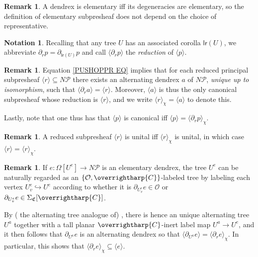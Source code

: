 \documentclass[a4paper,10pt
,draft
]{article}%
\numberwithin{equation}{section}
\numberwithin{figure}{section}
\theoremstyle{definition} %
\newtheorem{remark}[equation]{Remark}%
\newtheorem{notation}[equation]{Notation}%
\newcommand{\into}{\hookrightarrow}%
\newcommand{\vect}[1]{\text{\overrightharp{\ensuremath{#1}}}}
\renewcommand{\O}{\ensuremath{\mathcal O}}
\newcommand{\1}{\ensuremath{\mathbbm 1}}%
\begin{document}
\begin{remark}
	A dendrex is elementary iff its degeneracies are elementary,
	so the definition of elementary subpresheaf does not depend on the choice of representative.
\end{remark}


\begin{notation}
	Recalling that any tree $U$
	has an associated corolla $\mathsf{lr}(U)$, 
	we abbreviate
	$\partial_r p = \partial_{\mathsf{lr}(U)}p$
	and call
	$\langle \partial_r p \rangle$
	the \emph{reduction} of  
	$\langle p \rangle$.
\end{notation}




\begin{remark}\label{PUSHOPPRRST REM}
	Equation \eqref{PUSHOPPR EQ} 
	implies
	that for each reduced principal subpresheaf
	$\langle r \rangle \subseteq N \mathcal{P}$
	there exists an alternating dendrex $a$ of $N \mathcal P$, 
	\emph{unique up to isomorphism}, 
	such that
	$\langle \partial_r a \rangle = \langle r \rangle$.
	Moreover, $\langle a \rangle$ is thus the only canonical subpresheaf whose reduction is 
	$\langle r \rangle$,
	and we write
	$\langle r \rangle_{\chi} = \langle a \rangle$
	to denote this.
	
	Lastly, note that one thus has that 
	$\langle p \rangle$ is canonical iff
	$\langle p \rangle = \langle \partial_r p \rangle_{\chi}$.
\end{remark}


\begin{remark}\label{UNITALCASE REM}
	A reduced subpresheaf $\langle r \rangle$
	is unital iff 
	$\langle r \rangle_{\chi}$ is unital, in which case
	$\langle r \rangle = \langle r \rangle_{\chi}$.
\end{remark}



\begin{remark}\label{ELEMLABEL REM}
	If $e \colon \Omega[U^e] \to N \mathcal{P}$
	is an elementary dendrex, 
	the tree $U^e$ can be naturally regarded as an
	$\{\O,\vect{C}\}$-labeled tree by labeling each vertex $U^e_v \into U^e$ according to whether
	it is $\partial_{U^e_v} e \in \O $ or
	$ \partial_{U^e_v} e \in \Sigma_{\mathfrak{C}}[\vect{C}]$.
	
	By ({\color{blue} the alternating tree analogue of})
	\cite[Prop. 5.48]{BP_geo}, there is hence an unique alternating tree $U^a$ together with a tall planar $\vect{C}$-inert label map $U^a \to U^e$,
	and it then follows that
	$\partial_{U^a} e$ is an alternating dendrex so that
	$\langle \partial_{U^a} e \rangle = \langle \partial_r e \rangle_{\chi}$.
	In particular, this shows that
	$\langle \partial_r e \rangle_{\chi} \subseteq 
	\langle e \rangle$.
\end{remark}
\end{document}
